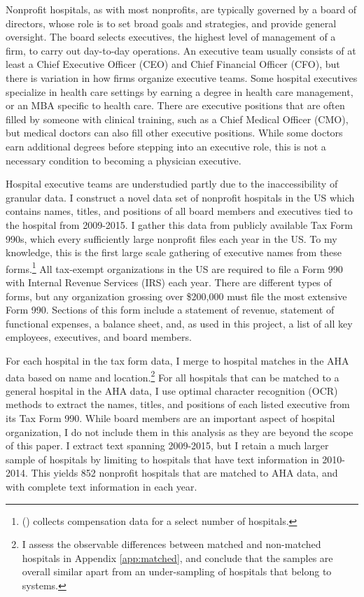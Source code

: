 \documentclass[12pt]{article}
\begin{document}
    Nonprofit hospitals, as with most nonprofits, are typically governed by a board of directors, whose role is to set broad goals and strategies, and provide general oversight. The board selects executives, the highest level of management of a firm, to carry out day-to-day operations. An executive team usually consists of at least a Chief Executive Officer (CEO) and Chief Financial Officer (CFO), but there is variation in how firms organize executive teams. Some hospital executives specialize in health care settings by earning a degree in health care management, or an MBA specific to health care. There are executive positions that are often filled by someone with clinical training, such as a Chief Medical Officer (CMO), but medical doctors can also fill other executive positions. While some doctors earn additional degrees before stepping into an executive role, this is not a necessary condition to becoming a physician executive. 

    Hospital executive teams are understudied partly due to the inaccessibility of granular data. I construct a novel data set of nonprofit hospitals in the US which contains names, titles, and positions of all board members and executives tied to the hospital from 2009-2015. I gather this data from publicly available Tax Form 990s, which every sufficiently large nonprofit files each year in the US. To my knowledge, this is the first large scale gathering of executive names from these forms.\footnote{\citeauthor{brickley2010board} (\citeyear{brickley2010board}) collects compensation data for a select number of hospitals.} All tax-exempt organizations in the US are required to file a Form 990 with Internal Revenue Services (IRS) each year. There are different types of forms, but any organization grossing over \$200,000 must file the most extensive Form 990. Sections of this form include a statement of revenue, statement of functional expenses, a balance sheet, and, as used in this project, a list of all key employees, executives, and board members. 

    For each hospital in the tax form data, I merge to hospital matches in the AHA data based on name and location.\footnote{I assess the observable differences between matched and non-matched hospitals in Appendix \ref{app:matched}, and conclude that the samples are overall similar apart from an under-sampling of hospitals that belong to systems.} For all hospitals that can be matched to a general hospital in the AHA data, I use optimal character recognition (OCR) methods to extract the names, titles, and positions of each listed executive from its Tax Form 990. While board members are an important aspect of hospital organization, I do not include them in this analysis as they are beyond the scope of this paper. I extract text spanning 2009-2015, but I retain a much larger sample of hospitals by limiting to hospitals that have text information in 2010-2014. This yields 852 nonprofit hospitals that are matched to AHA data, and with complete text information in each year. 
\end{document}
